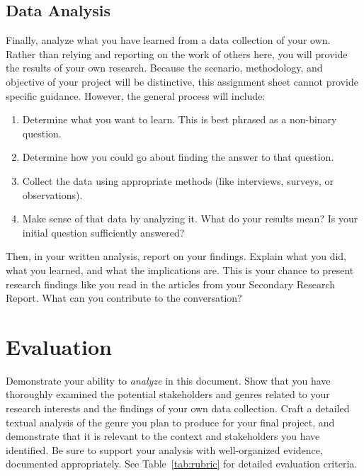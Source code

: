 \documentclass[10pt]{amsart}	%
\begin{document}
\subsection{Data Analysis} %
\label{sub:data_analysis}
Finally, analyze what you have learned from a data collection of your own. Rather than relying and reporting on the work of others here, you will provide the results of your own research. Because the scenario, methodology, and objective of your project will be distinctive, this assignment sheet cannot provide specific guidance. However, the general process will include:
\begin{enumerate}
	\item Determine what you want to learn. This is best phrased as a non-binary question.
	\item Determine how you could go about finding the answer to that question.
	\item Collect the data using appropriate methods (like interviews, surveys, or observations).
	\item Make sense of that data by analyzing it. What do your results mean? Is your initial question sufficiently answered?
\end{enumerate}

Then, in your written analysis, report on your findings. Explain what you did, what you learned, and what the implications are. This is your chance to present research findings like you read in the articles from your Secondary Research Report. What can you contribute to the conversation?



\section{Evaluation} %
\label{sec:eval}
Demonstrate your ability to \emph{analyze} in this document. Show that you have thoroughly examined the potential stakeholders and genres related to your research interests and the findings of your own data collection. Craft a detailed textual analysis of the genre you plan to produce for your final project, and demonstrate that it is relevant to the context and stakeholders you have identified. Be sure to support your analysis with well-organized evidence, documented appropriately. See Table~\ref{tab:rubric} for detailed evaluation criteria.
\end{document}
